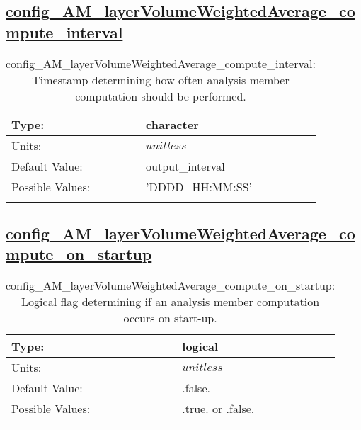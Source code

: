 \subsection[config\_AM\_layerVolumeWeightedAverage\_compute\_interval]{\hyperref[sec:nm_tab_AM_layerVolumeWeightedAverage]{config\_AM\_layerVolumeWeightedAverage\_compute\_interval}}
\label{subsec:nm_sec_config_AM_layerVolumeWeightedAverage_compute_interval}
\begin{center}
\begin{longtable}{| p{2.0in} || p{4.0in} |}
    \hline
    Type: & character \\
    \hline
    Units: & $unitless$ \\
    \hline
    Default Value: & output\_interval \\
    \hline
    Possible Values: & 'DDDD\_HH:MM:SS' \\
    \hline
    \caption{config\_AM\_layerVolumeWeightedAverage\_compute\_interval: Timestamp determining how often analysis member computation should be performed.}
\end{longtable}
\end{center}
\subsection[config\_AM\_layerVolumeWeightedAverage\_compute\_on\_startup]{\hyperref[sec:nm_tab_AM_layerVolumeWeightedAverage]{config\_AM\_layerVolumeWeightedAverage\_compute\_on\_startup}}
\label{subsec:nm_sec_config_AM_layerVolumeWeightedAverage_compute_on_startup}
\begin{center}
\begin{longtable}{| p{2.0in} || p{4.0in} |}
    \hline
    Type: & logical \\
    \hline
    Units: & $unitless$ \\
    \hline
    Default Value: & .false. \\
    \hline
    Possible Values: & .true. or .false. \\
    \hline
    \caption{config\_AM\_layerVolumeWeightedAverage\_compute\_on\_startup: Logical flag determining if an analysis member computation occurs on start-up.}
\end{longtable}
\end{center}
